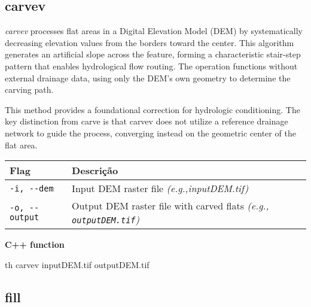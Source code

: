 \documentclass[
]{book}
\newenvironment{Shaded}{\begin{snugshade}}{\end{snugshade}}
\newcommand{\ExtensionTok}[1]{#1}
\newcommand{\NormalTok}[1]{#1}
\theoremstyle{definition}
\theoremstyle{definition}
\theoremstyle{definition}
\theoremstyle{definition}
\theoremstyle{remark}
\begin{document}
\subsection{carvev}\label{carvev}

\emph{carvev} processes flat areas in a Digital Elevation Model (DEM) by systematically decreasing elevation values from the borders toward the center. This algorithm generates an artificial slope across the feature, forming a characteristic stair-step pattern that enables hydrological flow routing. The operation functions without external drainage data, using only the DEM's own geometry to determine the carving path.

This method provides a foundational correction for hydrologic conditioning. The key distinction from carve is that carvev does not utilize a reference drainage network to guide the process, converging instead on the geometric center of the flat area.

\begin{longtable}[]{@{}
  >{\raggedright\arraybackslash}p{}
  >{\raggedright\arraybackslash}p{}@{}}
\toprule\noalign{}
\begin{minipage}[b]{\linewidth}\raggedright
Flag
\end{minipage} & \begin{minipage}[b]{\linewidth}\raggedright
Descrição
\end{minipage} \\
\midrule\noalign{}
\endhead
\bottomrule\noalign{}
\endlastfoot
\texttt{-i,\ -\/-dem} & Input DEM raster file \emph{(e.g.,inputDEM.tif)} \\
\texttt{-o,\ -\/-output} & Output DEM raster file with carved flats \emph{(e.g., \texttt{outputDEM.tif})} \\
\end{longtable}

\textbf{C++ function}

\begin{Shaded}
\begin{Highlighting}[]
\ExtensionTok{th}\NormalTok{ carvev inputDEM.tif outputDEM.tif}
\end{Highlighting}
\end{Shaded}

\subsection{fill}\label{fill}
\end{document}
